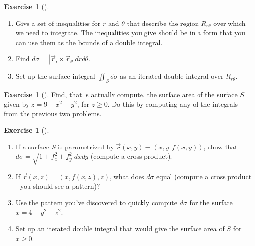 \documentclass[10pt,]{book}
\theoremstyle{plain}
\theoremstyle{definition}
\theoremstyle{definition}
\theoremstyle{definition}
\theoremstyle{definition}
\newtheorem{exploration}[project]{Exercise}
\theoremstyle{definition}
\numberwithin{equation}{section}
\begin{document}
\begin{exploration}[]\label{exploration-277}
\leavevmode%
\begin{enumerate}[font=\bfseries,label=(\alph*),ref=\alph*]
\item\label{task-753} Give a set of inequalities for \(r\) and \(\theta\) that describe the region \(R_{r\theta}\) over which we need to integrate. The inequalities you give should be in a form that you can use them as the bounds of a double integral.%
\item\label{task-754} Find \(d\sigma = \left|\vec r_r\times \vec r_\theta \right|drd\theta\).%
\item\label{task-755} Set up the surface integral \(\iint_S d\sigma\) as an iterated double integral over \(R_{r\theta}\).%
\end{enumerate}
\end{exploration}
\begin{exploration}[]\label{exploration-278}
Find, that is actually compute, the surface area of the surface \(S\) given by \(z=9-x^2-y^2\), for \(z\geq 0\). Do this by computing any of the integrals from the previous two problems.%
\end{exploration}
\begin{exploration}[]\label{exploration-279}
\leavevmode%
\begin{enumerate}[font=\bfseries,label=(\alph*),ref=\alph*]
\item\label{task-756} If a surface \(S\) is parametrized by \(\vec r(x,y) = (x,y,f(x,y))\), show that \(d\sigma = \sqrt{1+f_x^2+f_y^2}\ dxdy\) (compute a cross product).%
\item\label{task-757} If \(\vec r(x,z) = (x,f(x,z),z)\), what does \(d\sigma\) equal (compute a cross product - you should see a pattern)?%
\item\label{task-758} Use the pattern you've discovered to quickly compute \(d\sigma\) for the surface \(x=4-y^2-z^2\).%
\item\label{task-759} Set up an iterated double integral that would give the surface area of \(S\) for \(x\geq 0\).%
\end{enumerate}
\end{exploration}
\end{document}
